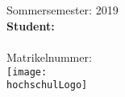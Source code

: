 \begin{titlepage}

\begin{center}

\Large{\studiengang}\\
\LARGE{\betreff}\\[4ex]

\huge{\textbf{\titel}}\\[1.5ex]
\Large{\textbf{\untertitel}}\\[4ex]

\normalsize
Sommersemester: 2019 
\\[3em]

\textbf{Student:}\\
\autorName\\
Matrikelnummer: \autorMatrikelnummer\\[5ex]


\texttt{[image: \\hochschulLogo]}\\[2ex]
\betriebName\\
\pruefer\\
\betriebAnschrift\\
\betriebOrt\\[5em]

\end{center}


\end{titlepage}